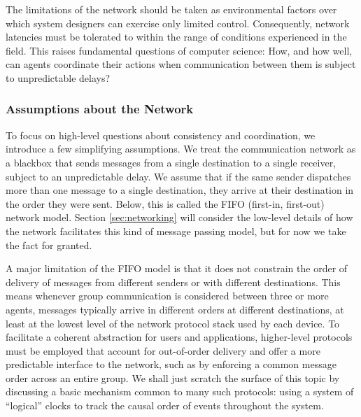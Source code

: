 \documentclass[]             %
{NASA}                       %
\theoremstyle{definition}
\begin{document}
The limitations of the network should be taken as environmental
factors over which system designers can exercise only limited
control. Consequently, network latencies must be tolerated to within
the range of conditions experienced in the field. This raises
fundamental questions of computer science: How, and how well, can
agents coordinate their actions when communication between them is
subject to unpredictable delays?

\subsubsection{Assumptions about the Network}
To focus on high-level questions about consistency and coordination,
we introduce a few simplifying assumptions. We treat the communication
network as a blackbox that sends messages from a single destination to
a single receiver, subject to an unpredictable delay.  We assume that
if the same sender dispatches more than one message to a single
destination, they arrive at their destination in the order they were
sent. Below, this is called the FIFO (first-in, first-out) network
model. Section \ref{sec:networking} will consider the low-level
details of how the network facilitates this kind of message passing
model, but for now we take the fact for granted.

A major limitation of the FIFO model is that it does not constrain the
order of delivery of messages from different senders or with different
destinations. This means whenever group communication is considered
between three or more agents, messages typically arrive in different
orders at different destinations, at least at the lowest level of the
network protocol stack used by each device. To facilitate a coherent
abstraction for users and applications, higher-level protocols must be
employed that account for out-of-order delivery and offer a more
predictable interface to the network, such as by enforcing a common
message order across an entire group. We shall just scratch the
surface of this topic by discussing a basic mechanism common to many
such protocols: using a system of ``logical'' clocks to track the
causal order of events throughout the system.
\end{document}
